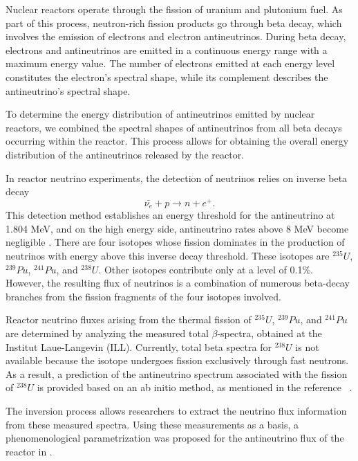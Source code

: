Nuclear reactors operate through the fission of uranium and plutonium fuel. As part of this process, neutron-rich fission products go through beta decay, which involves the emission of electrons and electron antineutrinos. During beta decay, electrons and antineutrinos are emitted in a continuous energy range with a maximum energy value.  The number of electrons emitted at each energy level constitutes the electron's spectral shape, while its complement describes the antineutrino's spectral shape.

To determine the energy distribution of antineutrinos emitted by nuclear reactors, we combined the spectral shapes of antineutrinos from all beta decays occurring within the reactor. This process allows for obtaining the overall energy distribution of the antineutrinos released by the reactor.

In reactor neutrino experiments, the detection of neutrinos relies on inverse beta decay
\begin{equation*}
    \bar{\nu_e}+p \rightarrow n + e^+.
\end{equation*}
This detection method establishes an energy threshold for the antineutrino at 1.804 MeV, and on the high energy side, antineutrino rates above 8 MeV become negligible \cite{HUBER2016268}.
There are four isotopes whose fission dominates in the production of neutrinos with energy above this inverse decay threshold. These isotopes are $^{235}U$, $^{239}Pu$, $^{241}Pu$, and $^{238}U$. Other isotopes contribute only at a level of 0.1$\%$. However, the resulting flux of neutrinos is a combination of numerous beta-decay branches from the fission fragments of the four isotopes involved.

Reactor neutrino fluxes arising from the thermal fission of $^{235}U$, $^{239}Pu$, and $^{241}Pu$ are determined by analyzing the measured total $\beta$-spectra, obtained at the Institut Laue-Langevin (ILL). Currently, total beta spectra for $^{238}U$ is not available because the isotope undergoes fission exclusively through fast neutrons. As a result, a prediction of the antineutrino spectrum associated with the fission of $^{238}U$ is provided based on an ab initio method, as mentioned in the reference \
\cite{Mueller_2011}.

The inversion process allows researchers to extract the neutrino flux information from these measured spectra. Using these measurements as a basis, a phenomenological parametrization was proposed for the antineutrino flux of the reactor in \cite{PhysRevD.70.053011}.

